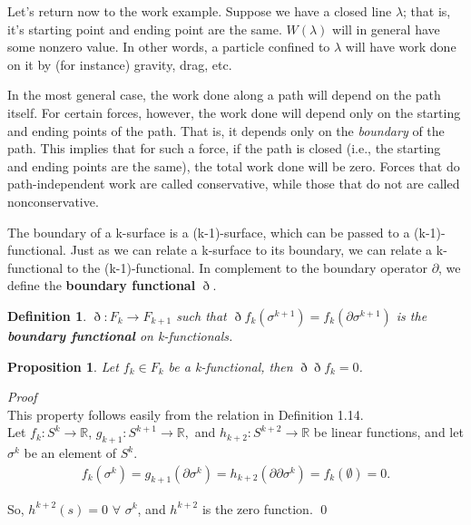 \documentclass{book}
\newtheorem{defn}[equation]{Definition}
\newtheorem{prop}[equation]{Proposition}
\renewenvironment{proof}{\emph{Proof}}{\qed}
\begin{document}
Let's return now to the work example. Suppose we have a closed line $\lambda$; that is, it's starting point and ending point are the same. $W(\lambda)$ will in general have some nonzero value. In other words, a particle confined to $\lambda$ will have work done on it by (for instance) gravity, drag, etc. 


In the most general case, the work done along a path will depend on the path itself. For certain forces, however, the work done will depend only on the starting and ending points of the path. That is, it depends only on the \emph{boundary} of the path. This implies that for such a force, if the path is closed (i.e., the starting and ending points are the same), the total work done will be zero. Forces that do path-independent work are called conservative, while those that do not are called nonconservative. 

The boundary of a k-surface is a (k-1)-surface, which can be passed to a (k-1)-functional. Just as we can relate a k-surface to its boundary, we can relate a k-functional to the (k-1)-functional. In complement to the boundary operator $\partial$, we define the \textbf{boundary functional} $\eth$. 



\begin{defn}
	$\eth : F_k \to F_{k+1}$ such that $\eth f_k(\sigma^{k+1}) = f_k(\partial \sigma^{k+1})$ is the \textbf{boundary functional} on k-functionals. 
\end{defn}

\begin{prop}
	Let $f_k \in F_k$ be a k-functional, then $\eth\eth f_k = 0 $.
	
\end{prop}
\begin{proof}\\
	This property follows easily from the relation in Definition 1.14.\\ 
	Let $f_k : S^k \to \mathbb{R}$, $g_{k+1} : S^{k+1} \to \mathbb{R},$ and $h_{k+2}: S^{k+2} \to \mathbb{R}$ be linear functions, and let $\sigma^k$ be an element of $S^k$. \begin{gather}f_k(\sigma^k) = g_{k+1}(\partial \sigma^k) = h_{k+2}(\partial\partial \sigma^k) = f_k(\emptyset) = 0.\end{gather} 
	
	So, $h^{k+2}(s) = 0$ $\forall$ $\sigma^k$, and $h^{k+2}$ is the zero function. 
\end{proof}\\
\end{document}
